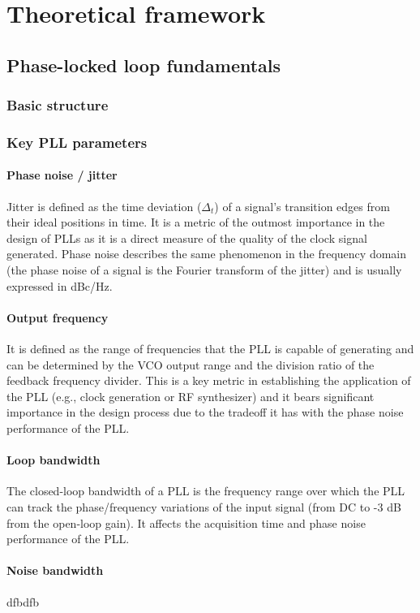 \chapter{Theoretical framework}

\section{Phase-locked loop fundamentals}
\subsection{Basic structure}
\subsection{Key PLL parameters}
\subsubsection{Phase noise / jitter}
Jitter is defined as the time deviation ($\Delta_t$) of a signal's transition edges from their ideal positions in time. It is a metric of the outmost importance in the design of PLLs 
as it is a direct measure of the quality of the clock signal generated. Phase noise describes the same phenomenon in the frequency domain (the phase noise of a signal is the Fourier 
transform of the jitter) and is usually expressed in dBc/Hz.
\subsubsection{Output frequency}
It is defined as the range of frequencies that the PLL is capable of generating and can be determined by the VCO output range and the division ratio of the feedback frequency divider. This
is a key metric in establishing the application of the PLL (e.g., clock generation or RF synthesizer) and it bears significant importance in the design process due to the tradeoff 
it has with the phase noise performance of the PLL.
\subsubsection{Loop bandwidth}
The closed-loop bandwidth of a PLL is the frequency range over which the PLL can track the phase/frequency variations of the input signal (from DC to -3 dB from the open-loop 
gain). It affects the acquisition time and phase noise performance of the PLL.
\subsubsection{Noise bandwidth}
dfbdfb
